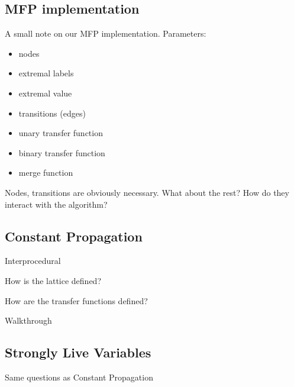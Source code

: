 \documentclass{article}
\begin{document}
\subsection*{MFP implementation}

A small note on our MFP implementation. Parameters:

\begin{itemize}
	\item nodes
	\item extremal labels
	\item extremal value
	\item transitions (edges)
	\item unary transfer function
	\item binary transfer function
	\item merge function
\end{itemize}

Nodes, transitions are obviously necessary. What about the rest? How do they interact with the algorithm?

\subsection*{Constant Propagation}

Interprocedural

How is the lattice defined?

How are the transfer functions defined?

Walkthrough

\subsection*{Strongly Live Variables}

Same questions as Constant Propagation
\end{document}
